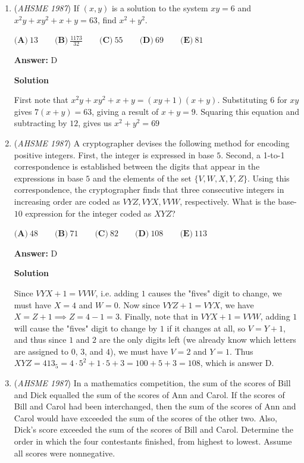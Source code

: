 \begin{enumerate}
 -j314andrews

 


	\item (\textit{AHSME 1987}) If $(x, y)$ is a solution to the system
$xy=6$ and $x^2y+xy^2+x+y=63$,
find $x^2+y^2$.


 $\textbf{(A)}\ 13 \qquad \textbf{(B)}\ \frac{1173}{32} \qquad \textbf{(C)}\ 55 \qquad \textbf{(D)}\ 69 \qquad \textbf{(E)}\ 81$

 \textbf{Answer: }D



\textbf{Solution}

First note that $x^2y+xy^2+x+y= (xy+1)(x+y)$. Substituting $6$ for $xy$ gives $7(x+y)= 63$, giving a result of $x+y=9$. Squaring this equation and subtracting by $12$, gives us $x^2+y^2= \boxed{69}$



	\item (\textit{AHSME 1987}) A cryptographer devises the following method for encoding positive integers. First, the integer is expressed in base $5$. 
Second, a 1-to-1 correspondence is established between the digits that appear in the expressions in base $5$ and the elements of the set 
$\{V, W, X, Y, Z\}$. Using this correspondence, the cryptographer finds that three consecutive integers in increasing 
order are coded as $VYZ, VYX, VVW$, respectively. What is the base-$10$ expression for the integer coded as $XYZ$?


 $\textbf{(A)}\ 48 \qquad \textbf{(B)}\ 71 \qquad \textbf{(C)}\ 82 \qquad \textbf{(D)}\ 108 \qquad \textbf{(E)}\ 113$

 \textbf{Answer: }D



\textbf{Solution}

Since $VYX + 1 = VVW$, i.e. adding $1$ causes the "fives" digit to change, we must have $X = 4$ and $W = 0$. Now since $VYZ + 1 = VYX$, we have $X = Z + 1 \implies Z = 4 - 1 = 3$. Finally, note that in $VYX + 1 = VVW$, adding $1$ will cause the "fives" digit to change by $1$ if it changes at all, so $V = Y + 1$, and thus since $1$ and $2$ are the only digits left (we already know which letters are assigned to $0$, $3$, and $4$), we must have $V = 2$ and $Y = 1$. Thus $XYZ = 413_{5} = 4 \cdot 5^{2} + 1 \cdot 5 + 3 = 100 + 5 + 3 = 108$, which is answer $\boxed{\text{D}}$.

 


	\item (\textit{AHSME 1987}) In a mathematics competition, the sum of the scores of Bill and Dick equalled the sum of the scores of Ann and Carol. 
If the scores of Bill and Carol had been interchanged, then the sum of the scores of Ann and Carol would have exceeded 
the sum of the scores of the other two. Also, Dick's score exceeded the sum of the scores of Bill and Carol. 
Determine the order in which the four contestants finished, from highest to lowest. Assume all scores were nonnegative.



\end{enumerate}
